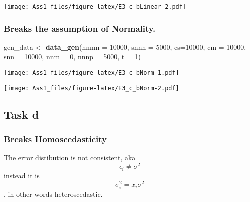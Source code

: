 \documentclass[
]{article}
\newenvironment{Shaded}{\begin{snugshade}}{\end{snugshade}}
\newcommand{\AttributeTok}[1]{\textcolor[rgb]{0.13,0.29,0.53}{#1}}
\newcommand{\DecValTok}[1]{\textcolor[rgb]{0.00,0.00,0.81}{#1}}
\newcommand{\FunctionTok}[1]{\textcolor[rgb]{0.13,0.29,0.53}{\textbf{#1}}}
\newcommand{\NormalTok}[1]{#1}
\newcommand{\OtherTok}[1]{\textcolor[rgb]{0.56,0.35,0.01}{#1}}
\newcommand{\SpecialCharTok}[1]{\textcolor[rgb]{0.81,0.36,0.00}{\textbf{#1}}}
\begin{document}
\texttt{[image: Ass1\_files/figure-latex/E3\_c\_bLinear-2.pdf]}

\subsubsection{Breaks the assumption of
Normality.}\label{breaks-the-assumption-of-normality.}

\begin{Shaded}
\begin{Highlighting}[]
\NormalTok{gen\_data }\OtherTok{\textless{}{-}} \FunctionTok{data\_gen}\NormalTok{(}\AttributeTok{nnnm =} \DecValTok{10000}\NormalTok{, }\AttributeTok{snnn =} \DecValTok{5000}\NormalTok{, }\AttributeTok{cs=}\DecValTok{10000}\NormalTok{, }\AttributeTok{cm =} \DecValTok{10000}\NormalTok{, }\AttributeTok{snn =} \DecValTok{10000}\NormalTok{, }\AttributeTok{nnm =} \DecValTok{0}\NormalTok{, }\AttributeTok{nnnp =} \DecValTok{5000}\NormalTok{, }\AttributeTok{t =} \DecValTok{1}\NormalTok{)}
\end{Highlighting}
\end{Shaded}

\texttt{[image: Ass1\_files/figure-latex/E3\_c\_bNorm-1.pdf]}

\begin{Shaded}
\end{Shaded}

\texttt{[image: Ass1\_files/figure-latex/E3\_c\_bNorm-2.pdf]}

\subsection{Task d}\label{task-d-1}

\subsubsection{Breaks Homoscedasticity}\label{breaks-homoscedasticity}

The error distibution is not consistent, aka
\[ \epsilon_i \ne \sigma^2 \] instead it is
\[ \sigma_{i}^2 = x_{i} \sigma^2 \], in other words heteroscedastic.
\end{document}
